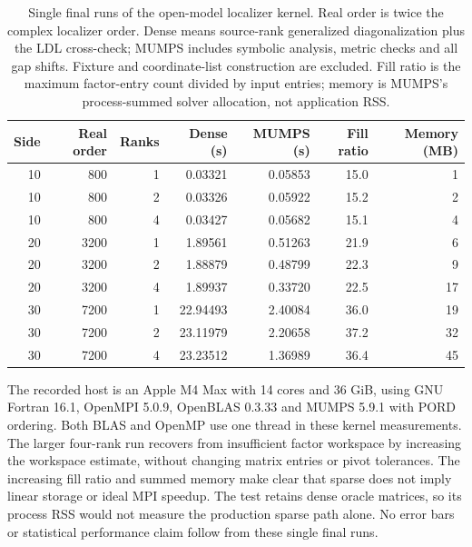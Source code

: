 \documentclass[11pt]{article}
\begin{document}
\begin{table}[htbp]
\centering\small
\setlength{\tabcolsep}{4pt}
\begin{tabular}{rrrrrrr}
\toprule
Side & Real order & Ranks & Dense (s) & MUMPS (s) & Fill ratio & Memory (MB)\\
\midrule
10 & 800 & 1 & 0.03321 & 0.05853 & 15.0 & 1\\
10 & 800 & 2 & 0.03326 & 0.05922 & 15.2 & 2\\
10 & 800 & 4 & 0.03427 & 0.05682 & 15.1 & 4\\
20 & 3200 & 1 & 1.89561 & 0.51263 & 21.9 & 6\\
20 & 3200 & 2 & 1.88879 & 0.48799 & 22.3 & 9\\
20 & 3200 & 4 & 1.89937 & 0.33720 & 22.5 & 17\\
30 & 7200 & 1 & 22.94493 & 2.40084 & 36.0 & 19\\
30 & 7200 & 2 & 23.11979 & 2.20658 & 37.2 & 32\\
30 & 7200 & 4 & 23.23512 & 1.36989 & 36.4 & 45\\
\bottomrule
\end{tabular}
\caption{Single final runs of the open-model localizer kernel.
Real order is twice the complex localizer order. Dense means
source-rank generalized diagonalization plus the LDL cross-check;
MUMPS includes symbolic analysis, metric checks and all gap shifts.
Fixture and coordinate-list construction are excluded. Fill ratio
is the maximum factor-entry count divided by input entries;
memory is MUMPS's process-summed solver allocation, not application RSS.}
\label{tab:si-localizer-cost}
\end{table}

The recorded host is an Apple M4 Max with 14 cores and 36 GiB,
using GNU Fortran 16.1, OpenMPI 5.0.9, OpenBLAS 0.3.33 and
MUMPS 5.9.1 with PORD ordering. Both BLAS and OpenMP use one
thread in these kernel measurements. The larger four-rank run
recovers from insufficient factor workspace by increasing the
workspace estimate, without changing matrix entries or pivot
tolerances. The increasing fill ratio and summed memory make
clear that sparse does not imply linear storage or ideal MPI speedup.
The test retains dense oracle matrices, so its process RSS would
not measure the production sparse path alone. No error bars or
statistical performance claim follow from these single final runs.
\end{document}
